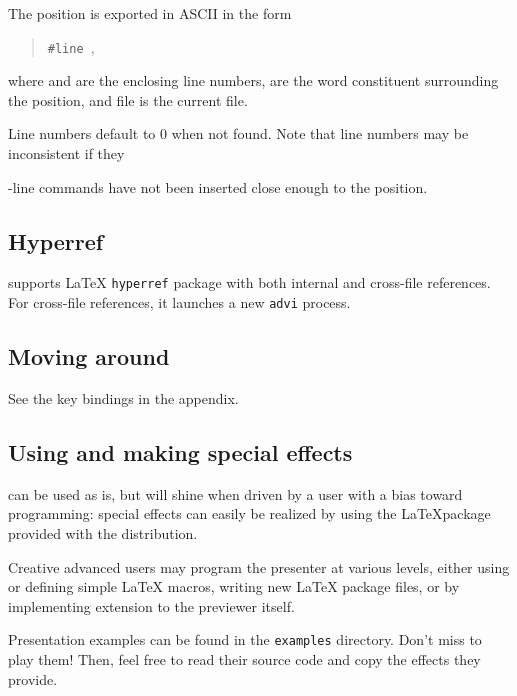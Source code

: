 \documentclass[12pt]{article}
\begin{document}
The position is exported in ASCII in the form
\begin{quote}
\verb"#line ",  
\doctt {<<}\doctt{>><<}\doctt{>>}
\end{quote}
where  and   are the enclosing line numbers, 
 are the word constituent surrounding the
position, and  file is the current file. 

Line numbers default to $0$ when not found. Note that line numbers may be
inconsistent if they \docdef \special-line commands have not been inserted
close enough to the position.

\subsection {Hyperref}

{\ActiveDVI} supports {\LaTeX} {\tt hyperref} package 
with both internal and cross-file references. For cross-file
references, it launches a new \verb"advi" process. 


\subsection {Moving around}

See the key bindings in the appendix.

\subsection {Using and making special effects}

{\ActiveDVI} can be used as is, but will shine when driven by a user
with a bias toward programming: special effects can easily 
be realized by using the \LaTeX package provided with the distribution. 

Creative advanced users may program the presenter at various levels, either
using or defining simple {\LaTeX} macros, writing new {\LaTeX} package
files, or by implementing extension to the previewer itself.

Presentation examples can be found in the 
\verb"examples" directory. Don't miss to play them! Then, feel free
to read their source code and copy the effects they provide.

\end{document}
